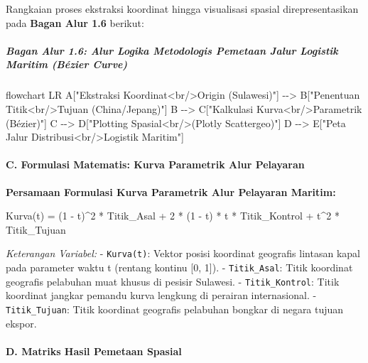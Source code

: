 \documentclass[
]{article}
\newenvironment{Shaded}{}{}
\newcommand{\NormalTok}[1]{#1}
\begin{document}
Rangkaian proses ekstraksi koordinat hingga visualisasi spasial
direpresentasikan pada \textbf{Bagan Alur 1.6} berikut:

\subparagraph{Bagan Alur 1.6: Alur Logika Metodologis Pemetaan Jalur
Logistik Maritim (Bézier
Curve)}\label{bagan-alur-1.6-alur-logika-metodologis-pemetaan-jalur-logistik-maritim-buxe9zier-curve}

\begin{Shaded}
\begin{Highlighting}[]
\NormalTok{flowchart LR}
\NormalTok{    A["Ekstraksi Koordinat\textless{}br/\textgreater{}Origin (Sulawesi)"] {-}{-}\textgreater{} B["Penentuan Titik\textless{}br/\textgreater{}Tujuan (China/Jepang)"]}
\NormalTok{    B {-}{-}\textgreater{} C["Kalkulasi Kurva\textless{}br/\textgreater{}Parametrik (Bézier)"]}
\NormalTok{    C {-}{-}\textgreater{} D["Plotting Spasial\textless{}br/\textgreater{}(Plotly Scattergeo)"]}
\NormalTok{    D {-}{-}\textgreater{} E["Peta Jalur Distribusi\textless{}br/\textgreater{}Logistik Maritim"]}
\end{Highlighting}
\end{Shaded}

\paragraph{C. Formulasi Matematis: Kurva Parametrik Alur
Pelayaran}\label{c.-formulasi-matematis-kurva-parametrik-alur-pelayaran}

\textbf{Persamaan Formulasi Kurva Parametrik Alur Pelayaran Maritim:}

\begin{Shaded}
\begin{Highlighting}[]
\NormalTok{Kurva(t) = (1 {-} t)\^{}2 * Titik\_Asal + 2 * (1 {-} t) * t * Titik\_Kontrol + t\^{}2 * Titik\_Tujuan}
\end{Highlighting}
\end{Shaded}

\emph{Keterangan Variabel:} - \texttt{Kurva(t)}: Vektor posisi koordinat
geografis lintasan kapal pada parameter waktu t (rentang kontinu {[}0,
1{]}). - \texttt{Titik\_Asal}: Titik koordinat geografis pelabuhan muat
khusus di pesisir Sulawesi. - \texttt{Titik\_Kontrol}: Titik koordinat
jangkar pemandu kurva lengkung di perairan internasional. -
\texttt{Titik\_Tujuan}: Titik koordinat geografis pelabuhan bongkar di
negara tujuan ekspor.

\paragraph{D. Matriks Hasil Pemetaan
Spasial}\label{d.-matriks-hasil-pemetaan-spasial}
\end{document}
